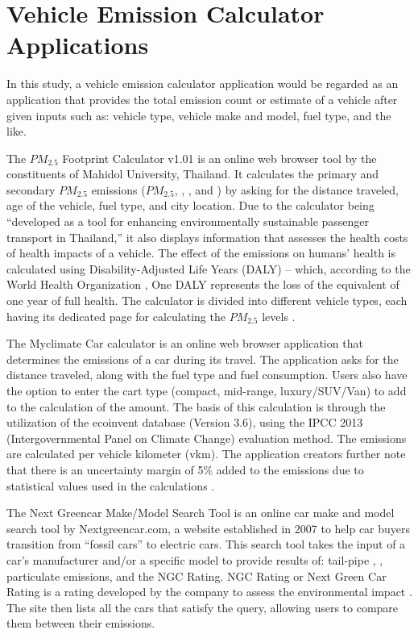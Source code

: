 \section{Vehicle Emission Calculator Applications}
	In this study, a vehicle emission calculator application would be regarded as an application that provides the total emission count or estimate of a vehicle after given inputs such as: vehicle type, vehicle make and model, fuel type, and the like.
	
	The $PM_{2.5}$ Footprint Calculator v1.01 is an online web browser tool by the constituents of Mahidol University, Thailand. It calculates the primary and secondary $PM_{2.5}$ emissions ($PM_{2.5}$, , , and ) by asking for the distance traveled, age of the vehicle, fuel type, and city location. Due to the calculator being “developed as a tool for enhancing environmentally sustainable passenger transport in Thailand,” it also displays information that assesses the health costs of health impacts of a vehicle. The effect of the emissions on humans’ health is calculated using  Disability-Adjusted Life Years (DALY) – which, according to the World Health Organization \citeyear{WHO_nd}, One DALY represents the loss of the equivalent of one year of full health. The calculator is divided into different vehicle types, each having its dedicated page for calculating the $PM_{2.5}$ levels \cite{pm25_footprint}.
	
	

	The Myclimate Car calculator is an online web browser application that determines the  emissions of a car during its travel. The application asks for the distance traveled, along with the fuel type and fuel consumption. Users also have the option to enter the cart type (compact, mid-range, luxury/SUV/Van) to add to the calculation of the  amount.  The basis of this calculation is through the utilization of the ecoinvent database (Version 3.6), using the IPCC 2013  (Intergovernmental Panel on Climate Change) evaluation method. The emissions are calculated per vehicle kilometer (vkm). The application creators further note that there is an uncertainty margin of 5\% added to the emissions due to statistical values used in the calculations \cite{MCF_ND}.

	The Next Greencar Make/Model Search Tool is an online car make and model search tool by Nextgreencar.com, a website established in 2007 to help car buyers transition from “fossil cars” to electric cars. This search tool takes the input of a car’s manufacturer and/or a specific model to provide results of: tail-pipe , , particulate emissions, and the NGC Rating. NGC Rating or Next Green Car Rating is a rating developed by the company to assess the environmental impact \cite{Lilly_ND}.  The site then lists all the cars that satisfy the query, allowing users to compare them between their emissions. 

